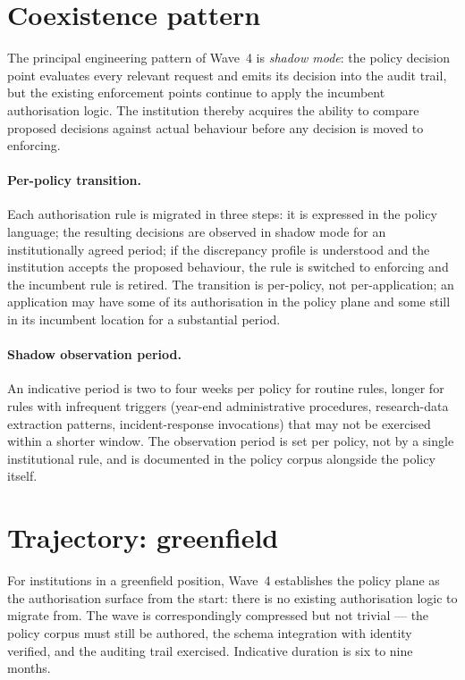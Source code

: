 \section{Coexistence pattern}
\label{sec:w4-coexistence}

The principal engineering pattern of Wave~4 is \emph{shadow mode}:
the policy decision point evaluates every relevant request and
emits its decision into the audit trail, but the existing
enforcement points continue to apply the incumbent authorisation
logic. The institution thereby acquires the ability to compare
proposed decisions against actual behaviour before any decision is
moved to enforcing.

\paragraph{Per-policy transition.} Each authorisation rule is
migrated in three steps: it is expressed in the policy language;
the resulting decisions are observed in shadow mode for an
institutionally agreed period; if the discrepancy profile is
understood and the institution accepts the proposed behaviour, the
rule is switched to enforcing and the incumbent rule is retired.
The transition is per-policy, not per-application; an application
may have some of its authorisation in the policy plane and some
still in its incumbent location for a substantial period.

\paragraph{Shadow observation period.} An indicative period is two
to four weeks per policy for routine rules, longer for rules with
infrequent triggers (year-end administrative procedures,
research-data extraction patterns, incident-response invocations)
that may not be exercised within a shorter window. The observation
period is set per policy, not by a single institutional rule, and
is documented in the policy corpus alongside the policy itself.

\section{Trajectory: greenfield}
\label{sec:w4-greenfield}

For institutions in a greenfield position, Wave~4 establishes the
policy plane as the authorisation surface from the start: there is
no existing authorisation logic to migrate from. The wave is
correspondingly compressed but not trivial --- the policy corpus
must still be authored, the schema integration with identity
verified, and the auditing trail exercised. Indicative duration is
six to nine months.

